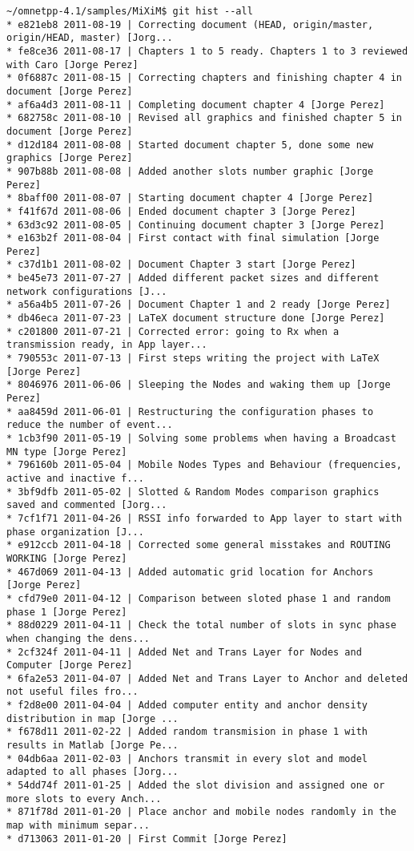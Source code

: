 \footnotesize
\begin{verbatim}
~/omnetpp-4.1/samples/MiXiM$ git hist --all
* e821eb8 2011-08-19 | Correcting document (HEAD, origin/master, origin/HEAD, master) [Jorg...
* fe8ce36 2011-08-17 | Chapters 1 to 5 ready. Chapters 1 to 3 reviewed with Caro [Jorge Perez]
* 0f6887c 2011-08-15 | Correcting chapters and finishing chapter 4 in document [Jorge Perez]
* af6a4d3 2011-08-11 | Completing document chapter 4 [Jorge Perez]
* 682758c 2011-08-10 | Revised all graphics and finished chapter 5 in document [Jorge Perez]
* d12d184 2011-08-08 | Started document chapter 5, done some new graphics [Jorge Perez]
* 907b88b 2011-08-08 | Added another slots number graphic [Jorge Perez]
* 8baff00 2011-08-07 | Starting document chapter 4 [Jorge Perez]
* f41f67d 2011-08-06 | Ended document chapter 3 [Jorge Perez]
* 63d3c92 2011-08-05 | Continuing document chapter 3 [Jorge Perez]
* e163b2f 2011-08-04 | First contact with final simulation [Jorge Perez]
* c37d1b1 2011-08-02 | Document Chapter 3 start [Jorge Perez]
* be45e73 2011-07-27 | Added different packet sizes and different network configurations [J...
* a56a4b5 2011-07-26 | Document Chapter 1 and 2 ready [Jorge Perez]
* db46eca 2011-07-23 | LaTeX document structure done [Jorge Perez]
* c201800 2011-07-21 | Corrected error: going to Rx when a transmission ready, in App layer...
* 790553c 2011-07-13 | First steps writing the project with LaTeX [Jorge Perez]
* 8046976 2011-06-06 | Sleeping the Nodes and waking them up [Jorge Perez]
* aa8459d 2011-06-01 | Restructuring the configuration phases to reduce the number of event...
* 1cb3f90 2011-05-19 | Solving some problems when having a Broadcast MN type [Jorge Perez]
* 796160b 2011-05-04 | Mobile Nodes Types and Behaviour (frequencies, active and inactive f...
* 3bf9dfb 2011-05-02 | Slotted & Random Modes comparison graphics saved and commented [Jorg...
* 7cf1f71 2011-04-26 | RSSI info forwarded to App layer to start with phase organization [J...
* e912ccb 2011-04-18 | Corrected some general misstakes and ROUTING WORKING [Jorge Perez]
* 467d069 2011-04-13 | Added automatic grid location for Anchors [Jorge Perez]
* cfd79e0 2011-04-12 | Comparison between sloted phase 1 and random phase 1 [Jorge Perez]
* 88d0229 2011-04-11 | Check the total number of slots in sync phase when changing the dens...
* 2cf324f 2011-04-11 | Added Net and Trans Layer for Nodes and Computer [Jorge Perez]
* 6fa2e53 2011-04-07 | Added Net and Trans Layer to Anchor and deleted not useful files fro...
* f2d8e00 2011-04-04 | Added computer entity and anchor density distribution in map [Jorge ...
* f678d11 2011-02-22 | Added random transmision in phase 1 with results in Matlab [Jorge Pe...
* 04db6aa 2011-02-03 | Anchors transmit in every slot and model adapted to all phases [Jorg...
* 54dd74f 2011-01-25 | Added the slot division and assigned one or more slots to every Anch...
* 871f78d 2011-01-20 | Place anchor and mobile nodes randomly in the map with minimum separ...
* d713063 2011-01-20 | First Commit [Jorge Perez]
\end{verbatim}
\normalsize

